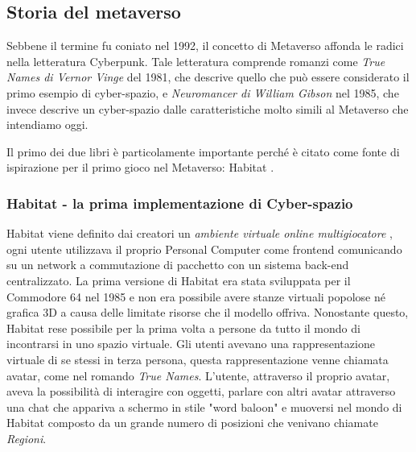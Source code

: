     \subsection{Storia del metaverso}
    Sebbene il termine fu coniato nel 1992, il concetto di Metaverso affonda le radici nella letteratura Cyberpunk.
    Tale letteratura comprende romanzi come \textit{True Names di Vernor Vinge} del 1981, che descrive quello che può essere considerato il primo esempio di cyber-spazio, e \textit{Neuromancer di William Gibson} nel 1985, che invece descrive un cyber-spazio dalle caratteristiche molto simili al Metaverso che intendiamo oggi.

    Il primo dei due libri è particolamente importante perché è citato come fonte di ispirazione per il primo gioco nel Metaverso: Habitat \cite{Habitat1990}.

        \subsubsection{Habitat - la prima implementazione di Cyber-spazio}

        
        Habitat viene definito dai creatori un \textit{ambiente virtuale online multigiocatore} \cite{Habitat1990}, ogni utente utilizzava il proprio Personal Computer come frontend comunicando su un network a commutazione di pacchetto con un sistema back-end centralizzato.
        La prima versione di Habitat era stata sviluppata per il Commodore 64 nel 1985 e non era possibile avere stanze virtuali popolose né grafica 3D a causa delle limitate risorse che il modello offriva.
        Nonostante questo, Habitat rese possibile per la prima volta a persone da tutto il mondo di incontrarsi in uno spazio virtuale.
        Gli utenti avevano una rappresentazione virtuale di se stessi in terza persona, questa rappresentazione venne chiamata avatar, come nel romando \textit{True Names}.
        L'utente, attraverso il proprio avatar, aveva la possibilità di interagire con oggetti, parlare con altri avatar attraverso una chat che appariva a schermo in stile "word baloon" e muoversi nel mondo di Habitat composto da un grande numero di posizioni che venivano chiamate \textit{Regioni}.

